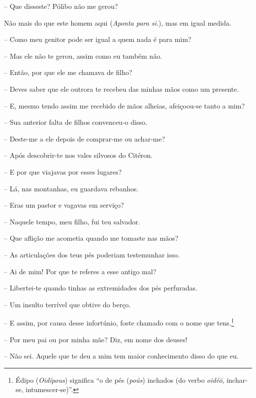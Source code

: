  --   Que disseste? Pólibo não me gerou?

  Não mais do que este homem aqui (\emph{Aponta para si.}), mas em igual
medida.

 --   Como meu genitor pode ser igual a quem nada é para mim?

 --    Mas ele não te gerou, assim como eu também não.

 --   Então, por que ele me chamava de filho?

 --   Deves saber que ele outrora te recebeu das minhas mãos como um presente.

 --   E, mesmo tendo assim me recebido de mãos alheias, afeiçoou-se tanto a
mim?

 --   Sua anterior falta de filhos convenceu-o disso.

 --   Deste-me a ele depois de comprar-me ou achar-me?

 --   Após descobrir-te nos vales silvosos do Citéron.

 --   E por que viajavas por esses lugares?

 --   Lá, nas montanhas, eu guardava rebanhos.

 --   Eras um pastor e vagavas em serviço?

 --    Naquele tempo, meu filho, fui teu salvador.

 --   Que aflição me acometia quando me tomaste nas mãos?

 --   As articulações dos teus pés poderiam testemunhar isso.

 --   Ai de mim! Por que te referes a esse antigo mal?

 --   Libertei-te quando tinhas as extremidades dos pés perfuradas.

 --   Um insulto terrível que obtive do berço.

 --   E assim, por causa desse infortúnio, foste chamado com o nome que
tens.\footnote{Édipo (\emph{Oidípous}) significa ``o de pés (\emph{poús})
  inchados (do verbo \emph{oidéō}, inchar-se, intumescer-se)''.}

 --   Por meu pai ou por minha mãe? Diz, em nome dos deuses!

 --   Não sei. Aquele que te deu a mim tem maior conhecimento disso do que eu.

